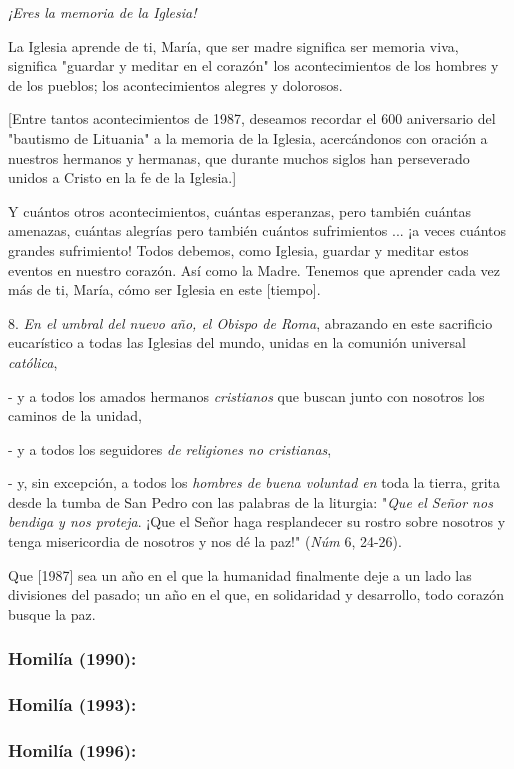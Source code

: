 \begin{body}
\emph{¡Eres la memoria de la Iglesia!}

La Iglesia aprende de ti, María, que ser madre significa ser memoria
viva, significa "guardar y meditar en el corazón" los acontecimientos de
los hombres y de los pueblos; los acontecimientos alegres y dolorosos.

{[}Entre tantos acontecimientos de 1987, deseamos recordar el 600
aniversario del "bautismo de Lituania" a la memoria de la Iglesia,
acercándonos con oración a nuestros hermanos y hermanas, que durante
muchos siglos han perseverado unidos a Cristo en la fe de la Iglesia.{]}

Y cuántos otros acontecimientos, cuántas esperanzas, pero también
cuántas amenazas, cuántas alegrías pero también cuántos sufrimientos ...
¡a veces cuántos grandes sufrimiento! Todos debemos, como Iglesia,
guardar y meditar estos eventos en nuestro corazón. Así como la Madre.
Tenemos que aprender cada vez más de ti, María, cómo ser Iglesia en este
{[}tiempo{]}.

8. \emph{En el umbral del nuevo año, el Obispo de Roma}, abrazando en
este sacrificio eucarístico a todas las Iglesias del mundo, unidas en la
comunión universal \emph{católica},

- y a todos los amados hermanos \emph{cristianos} que buscan junto con
nosotros los caminos de la unidad,

- y a todos los seguidores \emph{de religiones no cristianas},

- y, sin excepción, a todos los \emph{hombres de buena voluntad en} toda
la tierra, grita desde la tumba de San Pedro con las palabras de la
liturgia: "\emph{Que el Señor nos bendiga y nos proteja}. ¡Que el Señor
haga resplandecer su rostro sobre nosotros y tenga misericordia de
nosotros y nos dé la paz!" (\emph{Núm} 6, 24-26).

Que {[}1987{]} sea un año en el que la humanidad finalmente deje a un
lado las divisiones del pasado; un año en el que, en solidaridad y
desarrollo, todo corazón busque la paz.

\subsubsection{Homilía (1990): }

\subsubsection{Homilía (1993): }

\subsubsection{Homilía (1996): }


\end{body}
